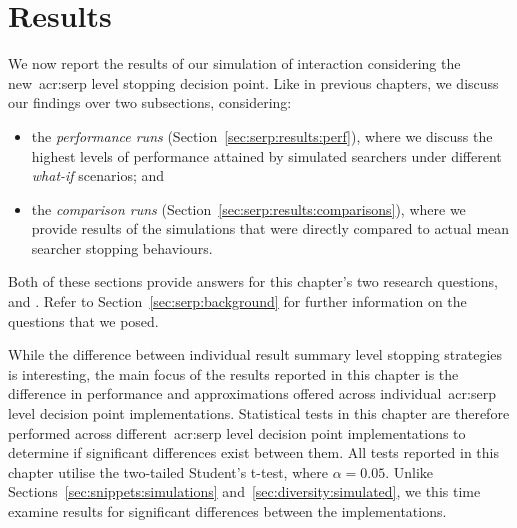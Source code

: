 \section{Results}\label{sec:serp:results}
We now report the results of our simulation of interaction considering the new~\gls{acr:serp} level stopping decision point. Like in previous chapters, we discuss our findings over two subsections, considering:

\begin{itemize}
    \item{the \emph{performance runs} (Section~\ref{sec:serp:results:perf}), where we discuss the highest levels of performance attained by simulated searchers under different \emph{what-if} scenarios; and}
    \item{the \emph{comparison runs} (Section~\ref{sec:serp:results:comparisons}), where we provide results of the simulations that were directly compared to actual mean searcher stopping behaviours.}
\end{itemize}

Both of these sections provide answers for this chapter's two research questions,  and . Refer to Section~\ref{sec:serp:background} for further information on the questions that we posed.

While the difference between individual result summary level stopping strategies is interesting, the main focus of the results reported in this chapter is the difference in performance and approximations offered across individual~\gls{acr:serp} level decision point implementations. Statistical tests in this chapter are therefore performed across different~\gls{acr:serp} level decision point implementations to determine if significant differences exist between them. All tests reported in this chapter utilise the two-tailed Student's t-test, where $\alpha=0.05$. Unlike Sections~\ref{sec:snippets:simulations} and~\ref{sec:diversity:simulated}, we this time examine results for significant differences between the implementations.

